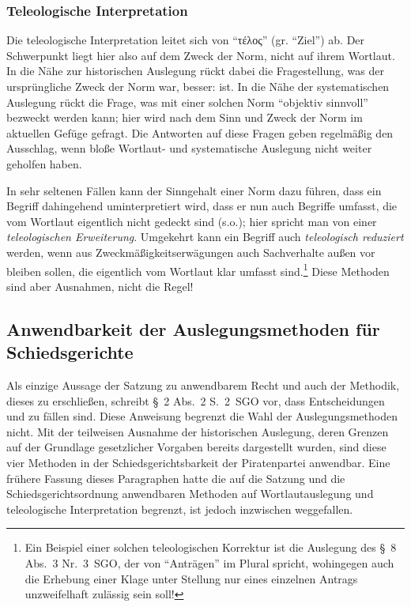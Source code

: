 \subsubsection{Teleologische Interpretation}
Die teleologische Interpretation leitet sich von \enquote{τέλος} (gr. \enquote{Ziel}) ab. Der Schwerpunkt liegt hier also auf dem Zweck der Norm, nicht auf ihrem Wortlaut. In die Nähe zur historischen Auslegung rückt dabei die Fragestellung, was der ursprüngliche Zweck der Norm war, besser: ist. In die Nähe der systematischen Auslegung rückt die Frage, was mit einer solchen Norm \enquote{objektiv sinnvoll} bezweckt werden kann; hier wird nach dem Sinn und Zweck der Norm im aktuellen Gefüge gefragt. Die Antworten auf diese Fragen geben regelmäßig den Ausschlag, wenn bloße Wortlaut- und systematische Auslegung nicht weiter geholfen haben.

In sehr seltenen Fällen kann der Sinngehalt einer Norm dazu führen, dass ein Begriff dahingehend uminterpretiert wird, dass er nun auch Begriffe umfasst, die vom Wortlaut eigentlich nicht gedeckt sind (s.o.); hier spricht man von einer \emph{teleologischen Erweiterung}. Umgekehrt kann ein Begriff auch \emph{teleologisch reduziert} werden, wenn aus Zweckmäßigkeitserwägungen auch Sachverhalte außen vor bleiben sollen, die eigentlich vom Wortlaut klar umfasst sind.\footnote{Ein Beispiel einer solchen teleologischen Korrektur ist die Auslegung des \S~8 Abs.~3 Nr.~3~SGO, der von \enquote{Anträgen} im Plural spricht, wohingegen auch die Erhebung einer Klage unter Stellung nur eines einzelnen Antrags unzweifelhaft zulässig sein soll!} Diese Methoden sind aber Ausnahmen, nicht die Regel!

\subsection{Anwendbarkeit der Auslegungsmethoden für Schiedsgerichte}
Als einzige Aussage der Satzung zu anwendbarem Recht und auch der Methodik, dieses zu erschließen, schreibt \S~2 Abs.~2 S.~2~SGO vor, dass Entscheidungen  und  zu fällen sind. Diese Anweisung begrenzt die Wahl der Auslegungsmethoden nicht. Mit der teilweisen Ausnahme der historischen Auslegung, deren Grenzen auf der Grundlage gesetzlicher Vorgaben bereits dargestellt wurden, sind diese vier Methoden in der Schiedsgerichtsbarkeit der Piratenpartei anwendbar. Eine frühere Fassung dieses Paragraphen hatte die auf die Satzung und die Schiedsgerichtsordnung anwendbaren Methoden auf Wortlautauslegung und teleologische Interpretation begrenzt, ist jedoch inzwischen weggefallen.

